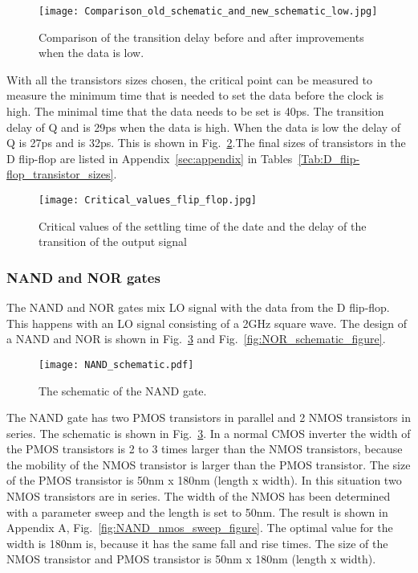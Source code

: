 \begin{figure}[h]
\texttt{[image: Comparison\_old\_schematic\_and\_new\_schematic\_low.jpg]}
\caption{ Comparison of the transition delay before and after improvements when the data is low.}
\label{fig:Comparison_old_schematic_and_new_schematic_low_figure}
\end{figure}

With all the transistors sizes chosen, the critical point can be measured to measure the minimum time that is needed to set the data before the clock is high. The minimal time that the data needs to be set is 40ps. The transition delay of Q and  is 29ps when the data is high. When the data is low the delay of Q is 27ps and  is 32ps. This is shown in Fig.~\ref{fig:Critical_values_flip_flop_figure}.The final sizes of transistors in the D flip-flop are listed in Appendix~\ref{sec:appendix} in Tables~\ref{Tab:D_flip-flop_transistor_sizes}.

\begin{figure}[h]
\texttt{[image: Critical\_values\_flip\_flop.jpg]}
\caption{ Critical values of the settling time of the date and the delay of the transition of the output signal}
\label{fig:Critical_values_flip_flop_figure}
\end{figure}

\subsubsection{NAND and NOR gates}\label{sec:frontend}
The NAND and NOR gates mix LO signal with the data from the D flip-flop. This happens with an LO signal consisting of a 2GHz square wave.
The design of a NAND and NOR is shown in Fig.~\ref{fig:NAND_schematic_figure} and Fig.~\ref{fig:NOR_schematic_figure}.

\begin{figure}[h]
\texttt{[image: NAND\_schematic.pdf]}
\caption{The schematic of the NAND gate.}
\label{fig:NAND_schematic_figure}
\end{figure}

The NAND gate has two PMOS transistors in parallel and 2 NMOS transistors in series. The schematic is shown in Fig.~\ref{fig:NAND_schematic_figure}. In a normal CMOS inverter the width of the PMOS transistors is 2 to 3 times larger than the NMOS transistors, because the mobility of the NMOS transistor is larger than the PMOS transistor. The size of the PMOS transistor is 50nm x 180nm (length x width). In this situation two NMOS transistors are in series. The width of the NMOS has been determined with a parameter sweep and the length is set to 50nm. The result is shown in Appendix A, Fig.~\ref{fig:NAND_nmos_sweep_figure}. The optimal value for the width is 180nm is, because it has the same fall and rise times. The size of the NMOS transistor and PMOS transistor is 50nm x 180nm (length x width).

